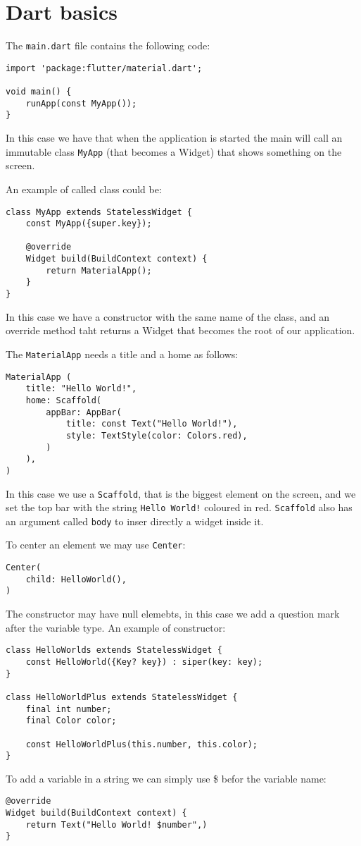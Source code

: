 \section{Dart basics}

The \texttt{main.dart} file contains the following code: 
\begin{verbatim}
import 'package:flutter/material.dart';

void main() {
    runApp(const MyApp());
}
\end{verbatim}
In this case we have that when the application is started the main will call an immutable class \texttt{MyApp} (that becomes a Widget) that shows something on the screen.

An example of called class could be: 
\begin{verbatim}
class MyApp extends StatelessWidget {
    const MyApp({super.key}); 

    @override
    Widget build(BuildContext context) {
        return MaterialApp();
    }
}
\end{verbatim}
In this case we have a constructor with the same name of the class, and an override method taht returns a Widget that becomes the root of our application. 

The \texttt{MaterialApp} needs a title and a home as follows: 
\begin{verbatim}
MaterialApp (
    title: "Hello World!",
    home: Scaffold(
        appBar: AppBar(
            title: const Text("Hello World!"),
            style: TextStyle(color: Colors.red),
        )
    ),
)
\end{verbatim}
In this case we use a \texttt{Scaffold}, that is the biggest element on the screen, and we set the top bar with the string \texttt{Hello World!} coloured in red. 
\texttt{Scaffold} also has an argument called \texttt{body} to inser directly a widget inside it. 

To center an element we may use \texttt{Center}: 
\begin{verbatim}
Center( 
    child: HelloWorld(),
)
\end{verbatim}

The constructor may have null elemebts, in this case we add a question mark after the variable type.
An example of constructor: 
\begin{verbatim}
class HelloWorlds extends StatelessWidget {
    const HelloWorld({Key? key}) : siper(key: key);
}

class HelloWorldPlus extends StatelessWidget {
    final int number; 
    final Color color; 

    const HelloWorldPlus(this.number, this.color);
}
\end{verbatim}
To add a variable in a string we can simply use \$ befor the variable name: 
\begin{verbatim}
@override
Widget build(BuildContext context) {
    return Text("Hello World! $number",)
}                               
\end{verbatim}